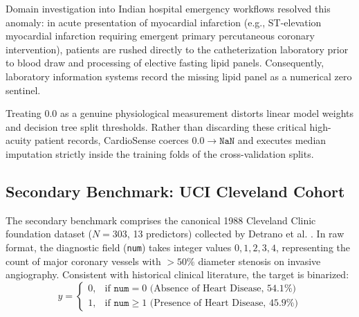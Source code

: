 \documentclass[conference]{IEEEtran}
\begin{document}
Domain investigation into Indian hospital emergency workflows resolved this anomaly: in acute presentation of myocardial infarction (e.g., ST-elevation myocardial infarction requiring emergent primary percutaneous coronary intervention), patients are rushed directly to the catheterization laboratory prior to blood draw and processing of elective fasting lipid panels. Consequently, laboratory information systems record the missing lipid panel as a numerical zero sentinel. 

Treating $0.0$ as a genuine physiological measurement distorts linear model weights and decision tree split thresholds. Rather than discarding these critical high-acuity patient records, CardioSense coerces $0.0 \rightarrow \texttt{NaN}$ and executes median imputation strictly inside the training folds of the cross-validation splits.

\subsection{Secondary Benchmark: UCI Cleveland Cohort}
The secondary benchmark comprises the canonical 1988 Cleveland Clinic foundation dataset ($N=303$, 13 predictors) collected by Detrano et al. \cite{uci}. In raw format, the diagnostic field (\texttt{num}) takes integer values $0, 1, 2, 3, 4$, representing the count of major coronary vessels with $>50\%$ diameter stenosis on invasive angiography. Consistent with historical clinical literature, the target is binarized:
\begin{equation}
y = \begin{cases} 
0, & \text{if } \texttt{num} = 0 \text{ (Absence of Heart Disease, } 54.1\% \text{)} \\
1, & \text{if } \texttt{num} \ge 1 \text{ (Presence of Heart Disease, } 45.9\% \text{)}
\end{cases}
\end{equation}
\end{document}
